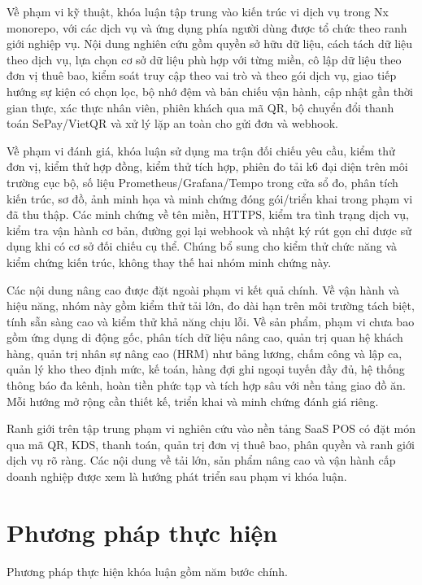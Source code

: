 Về phạm vi kỹ thuật, khóa luận tập trung vào kiến trúc vi dịch vụ trong Nx monorepo, với các dịch vụ và ứng dụng phía người dùng được tổ chức theo ranh giới nghiệp vụ. Nội dung nghiên cứu gồm quyền sở hữu dữ liệu, cách tách dữ liệu theo dịch vụ, lựa chọn cơ sở dữ liệu phù hợp với từng miền, cô lập dữ liệu theo đơn vị thuê bao, kiểm soát truy cập theo vai trò và theo gói dịch vụ, giao tiếp hướng sự kiện có chọn lọc, bộ nhớ đệm và bản chiếu vận hành, cập nhật gần thời gian thực, xác thực nhân viên, phiên khách qua mã QR, bộ chuyển đổi thanh toán SePay/VietQR và xử lý lặp an toàn cho gửi đơn và webhook.

Về phạm vi đánh giá, khóa luận sử dụng ma trận đối chiếu yêu cầu, kiểm thử đơn vị, kiểm thử hợp đồng, kiểm thử tích hợp, phiên đo tải k6 đại diện trên môi trường cục bộ, số liệu Prometheus/Grafana/Tempo trong cửa sổ đo, phân tích kiến trúc, sơ đồ, ảnh minh họa và minh chứng đóng gói/triển khai trong phạm vi đã thu thập. Các minh chứng về tên miền, HTTPS, kiểm tra tình trạng dịch vụ, kiểm tra vận hành cơ bản, đường gọi lại webhook và nhật ký rút gọn chỉ được sử dụng khi có cơ sở đối chiếu cụ thể. Chúng bổ sung cho kiểm thử chức năng và kiểm chứng kiến trúc, không thay thế hai nhóm minh chứng này.

Các nội dung nâng cao được đặt ngoài phạm vi kết quả chính. Về vận hành và hiệu năng, nhóm này gồm kiểm thử tải lớn, đo dài hạn trên môi trường tách biệt, tính sẵn sàng cao và kiểm thử khả năng chịu lỗi. Về sản phẩm, phạm vi chưa bao gồm ứng dụng di động gốc, phân tích dữ liệu nâng cao, quản trị quan hệ khách hàng, quản trị nhân sự nâng cao (HRM) như bảng lương, chấm công và lập ca, quản lý kho theo định mức, kế toán, hàng đợi ghi ngoại tuyến đầy đủ, hệ thống thông báo đa kênh, hoàn tiền phức tạp và tích hợp sâu với nền tảng giao đồ ăn. Mỗi hướng mở rộng cần thiết kế, triển khai và minh chứng đánh giá riêng.

Ranh giới trên tập trung phạm vi nghiên cứu vào nền tảng SaaS POS có đặt món qua mã QR, KDS, thanh toán, quản trị đơn vị thuê bao, phân quyền và ranh giới dịch vụ rõ ràng. Các nội dung về tải lớn, sản phẩm nâng cao và vận hành cấp doanh nghiệp được xem là hướng phát triển sau phạm vi khóa luận.

\section{Phương pháp thực hiện}

Phương pháp thực hiện khóa luận gồm năm bước chính.

